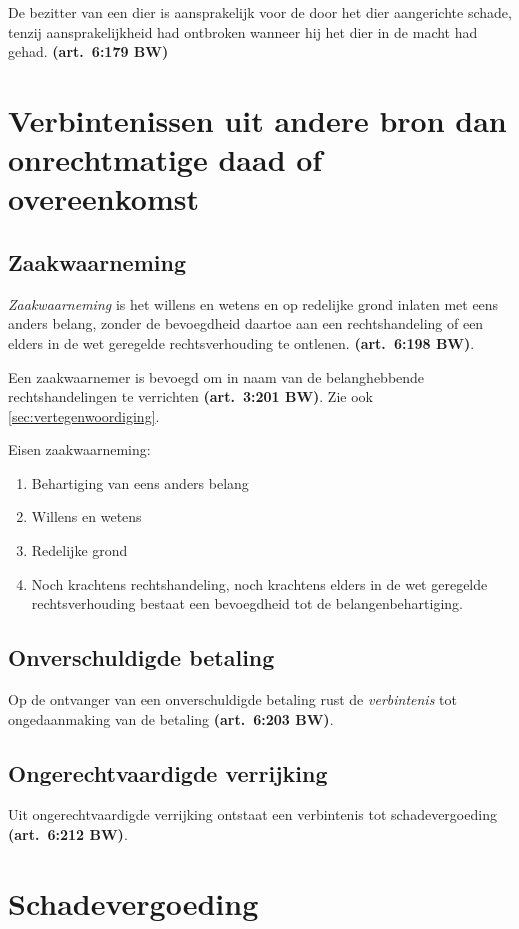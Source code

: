 \documentclass[a4paper]{article}
\newcommand{\art}[1]{\textbf{(art.~#1 BW)}\xspace}
\begin{document}
De bezitter van een dier is aansprakelijk voor de door het dier aangerichte
schade, tenzij aansprakelijkheid had ontbroken wanneer hij het dier in de
macht had gehad. \art{6:179}


\section{Verbintenissen uit andere bron dan onrechtmatige daad of overeenkomst}

\subsection{Zaakwaarneming}

\emph{Zaakwaarneming} is het willens en wetens en op redelijke grond inlaten
met eens anders belang, zonder de bevoegdheid daartoe aan een rechtshandeling
of een elders in de wet geregelde rechtsverhouding te ontlenen. \art{6:198}.

Een zaakwaarnemer is bevoegd om in naam van de belanghebbende
rechtshandelingen te verrichten \art{3:201}. Zie ook
\ref{sec:vertegenwoordiging}.

Eisen zaakwaarneming:
\begin{enumerate}
  \item Behartiging van eens anders belang
  \item Willens en wetens
  \item Redelijke grond
  \item Noch krachtens rechtshandeling, noch krachtens elders in de wet
    geregelde rechtsverhouding bestaat een bevoegdheid tot de
    belangenbehartiging.
\end{enumerate}

\subsection{Onverschuldigde betaling}

Op de ontvanger van een onverschuldigde betaling rust de \emph{verbintenis}
tot ongedaanmaking van de betaling \art{6:203}.

\subsection{Ongerechtvaardigde verrijking}

Uit ongerechtvaardigde verrijking ontstaat een verbintenis tot
schadevergoeding \art{6:212}.

\section{Schadevergoeding}
\end{document}
